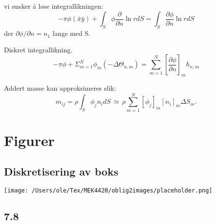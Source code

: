 \section{}
vi ønsker å løse integrallikningen:
\begin{equation}
    -\pi \phi(\bar{x}\bar{y})  + \int_{S} \phi  \frac{\partial }{\partial n} \ln r dS = \int_{S}  \frac{\partial \phi}{\partial n} \ln r dS
\end{equation}
der $\partial \phi / \partial n = n_1$ langs med S.

Diskret integrallikning.
\begin{equation}
    -\pi \phi  + \Sigma_{m=1}^N \phi_m (-\Delta \Theta_{n,m})   =  \sum_{m=1}^N [\frac{\partial \phi}{\partial n}]_m h_{n,m}
\end{equation}

Addert masse kan approksimeres slik:
\begin{equation}
    m_{ij}  = \rho \int_{S} \phi_j n_i dS \, \simeq \, \rho \sum_{m=1}^N [\phi_j]_m  [n_i]_m \Delta S_m.
\end{equation}


\section{Figurer}
\subsection{Diskretisering av boks}


{\noindent\texttt{[image: /Users/ole/Tex/MEK4420/oblig2images/placeholder.png]}
}

\subsection{7.8}

